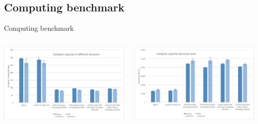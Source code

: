 \subsection{Computing benchmark}
\begin{frame}{Computing benchmark}
	\begin{columns}
		\begin{column}{0.5\textwidth}
			\centering{}
			\includegraphics[scale=0.27]{images/cpu-capacity.png}
		\end{column}
		\begin{column}{0.5\textwidth}
			\centering{}
			\includegraphics[scale=0.27]{images/cpu-time.png}
		\end{column}
	\end{columns}
\end{frame}

